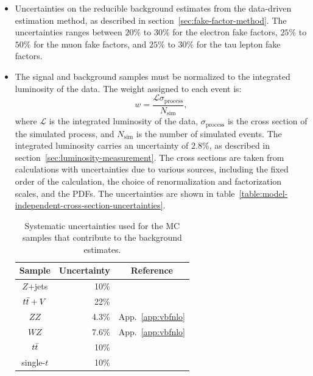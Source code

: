 \begin{itemize}
	\item Uncertainties on the reducible background estimates from the data-driven estimation method, as described in section~\ref{sec:fake-factor-method}. The uncertainties ranges between $20\%$ to $30\%$ for the electron fake factors, $25\%$ to $50\%$ for the muon fake factors, and $25\%$ to $30\%$ for the tau lepton fake factors.

	\item The signal and background samples must be normalized to the integrated luminosity of the data. The weight assigned to each event is:
	\begin{equation}
		w = \frac{\mathcal{L} \sigma_{\mathrm{process}}}{N_{\mathrm{sim}}},
	\end{equation}
	where $\mathcal{L}$ is the integrated luminosity of the data, $\sigma_{\mathrm{process}}$ is the cross section of the simulated process, and $N_{\mathrm{sim}}$ is the number of simulated events. The integrated luminosity carries an uncertainty of $2.8\%$, as described in section~\ref{sec:luminosity-measurement}. The cross sections are taken from calculations with uncertainties due to various sources, including the fixed order of the calculation, the choice of renormalization and factorization scales, and the PDFs. The uncertainties are shown in table~\ref{table:model-independent-cross-section-uncertainties}. 

\begin{table}
  \begin{center}
    \begin{tabular}{c r c}
      \hline
      Sample     &Uncertainty &Reference\\
      \hline
      $Z$+jets   &10\% \\
      $t\bar{t}+V$ &22\% &\cite{ttV} \\
      $ZZ$       &4.3\% &App.~\ref{app:vbfnlo} \\
      $WZ$       &7.6\% &App.~\ref{app:vbfnlo}\\
      $t\bar{t}$   &10\% &\cite{TopXS} \\
      single-$t$ &10\% &\cite{atlas_topmc}\\
      \hline
    \end{tabular}
    \caption{Systematic uncertainties used for the MC samples that contribute to the background estimates.}
    \label{tab:modle-independent-cross-section-uncertainties}
  \end{center}
\end{table}



\end{itemize}
